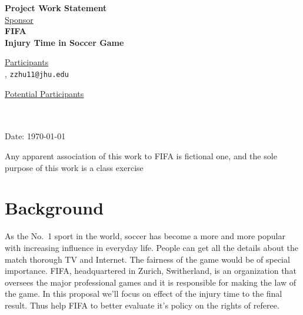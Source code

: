 \documentclass[12pt,letterpaper]{article}
\theoremstyle{definition}
\begin{document}
\def\shiftdowna{0.32in}  %
\def\shiftdownb{0.22in}  %


\begin{center}
\textbf{{\large Project Work Statement}}\\


\vspace \shiftdowna
\underline {Sponsor}\\ 
\vspace{5pt}
\textbf{{\large FIFA}}\\


\vspace \shiftdowna
\textbf{{\large  Injury Time in Soccer Game}}


\vspace{0.35in}
\vspace \shiftdownb
\underline {Participants} \\
\vspace{5pt}
, \texttt{zzhu11@jhu.edu}

\vspace \shiftdownb
\underline {Potential Participants}\\
\vspace{5pt} \ \\
\vspace{3pt}
\text{}\texttt{} \\
\vspace{3pt}
\text{} \texttt{}

\vspace \shiftdowna
Date: \today

\end{center}

\vfill  
\footnoterule
\noindent \small{Any apparent association of this work to FIFA is
fictional one, and the sole purpose of this work is a class exercise}

\newpage

\section{Background} 
As the No.~1 sport in the world, soccer has become a more and more popular with increasing influence in everyday life. People can get all the details about the match thorough TV and Internet. The fairness of the game would be of special importance. FIFA, headquartered in Zurich, Switherland, is an organization that oversees the major professional games and it is responsible for making the law of the game. In this proposal we'll focus on effect of the injury time to the final result. Thus help FIFA to better evaluate it's policy on the rights of referee. 
\end{document}
